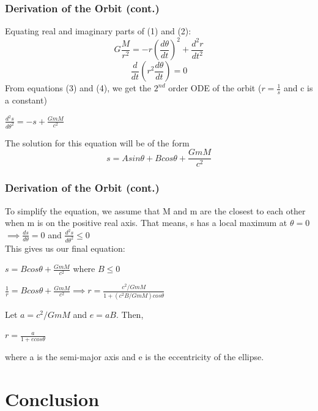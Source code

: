 \documentclass[10pt]{beamer}
\begin{document}
\begin{frame}
    \frametitle{Derivation of the Orbit (cont.)}
    Equating real and imaginary parts of (1) and (2):
    \begin{equation}
        G\frac{M}{r^2}=-r(\frac{d\theta}{dt})^2+\frac{d^2r}{dt^2}
    \end{equation}
    \begin{equation} \frac{d}{dt}(r^2\frac{d\theta}{dt})=0
    \end{equation}
    From equations (3) and (4), we get the $2^{nd}$ order ODE of the orbit ($r=\frac{1}{s}$ and c is a constant)
    \begin{center}
        $\frac{d^2s}{d\theta^2}=-s+\frac{GmM}{c^2}$
    \end{center}
    The solution for this equation will be of the form
    \begin{equation}
        s=Asin\theta+Bcos\theta+\frac{GmM}{c^2}
    \end{equation}
\end{frame}

\begin{frame}
    \frametitle{Derivation of the Orbit (cont.)}
    To simplify the equation, we assume that M and m are the closest to each other when m is on the positive real axis. That means, s has a local maximum at $\theta=0$
    $\implies \frac{ds}{d\theta}=0$ and $\frac{d^2s}{d\theta^2} \leq 0$\\
    This gives us our final equation:
    \begin{center}
        $s=Bcos\theta+\frac{GmM}{c^2}$ where $B\leq0$
    \end{center}
    \begin{center}
        $\frac{1}{r}=Bcos\theta+\frac{GmM}{c^2}\implies r=\frac{c^2/GmM}{1+(c^2B/GmM)cos\theta}$
    \end{center}
    Let $a=c^2/GmM$ and $e=aB$. Then,
    \begin{center}
        $r=\frac{a}{1+ecos\theta}$ \\
    \end{center}
    where a is the semi-major axis and e is the eccentricity of the ellipse.
\end{frame}

\section{Conclusion}
\end{document}
